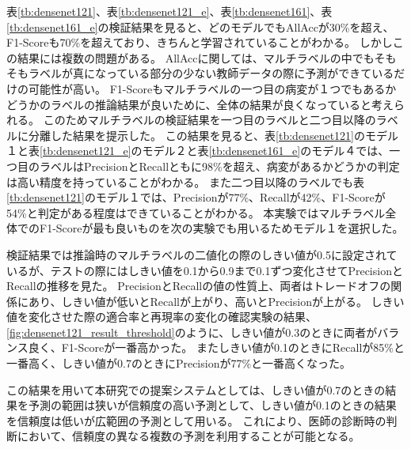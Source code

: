 表\ref{tb:densenet121}、表\ref{tb:densenet121_e}、表\ref{tb:densenet161}、表\ref{tb:densenet161_e}の検証結果を見ると、どのモデルでもAllAccが30\%を超え、F1-Scoreも70\%を超えており、きちんと学習されていることがわかる。
しかしこの結果には複数の問題がある。
AllAccに関しては、マルチラベルの中でもそもそもラベルが真になっている部分の少ない教師データの際に予測ができているだけの可能性が高い。
F1-Scoreもマルチラベルの一つ目の病変が１つでもあるかどうかのラベルの推論結果が良いために、全体の結果が良くなっていると考えられる。
このためマルチラベルの検証結果を一つ目のラベルと二つ目以降のラベルに分離した結果を提示した。
この結果を見ると、表\ref{tb:densenet121}のモデル１と表\ref{tb:densenet121_e}のモデル２と表\ref{tb:densenet161_e}のモデル４では、一つ目のラベルはPrecisionとRecallともに98\%を超え、病変があるかどうかの判定は高い精度を持っていることがわかる。
また二つ目以降のラベルでも表\ref{tb:densenet121}のモデル１では、Precisionが77\%、Recallが42\%、F1-Scoreが54\%と判定がある程度はできていることがわかる。
本実験ではマルチラベル全体でのF1-Scoreが最も良いものを次の実験でも用いるためモデル１を選択した。

検証結果では推論時のマルチラベルの二値化の際のしきい値が0.5に設定されているが、テストの際にはしきい値を0.1から0.9まで0.1ずつ変化させてPrecisionとRecallの推移を見た。
PrecisionとRecallの値の性質上、両者はトレードオフの関係にあり、しきい値が低いとRecallが上がり、高いとPrecisionが上がる。
しきい値を変化させた際の適合率と再現率の変化の確認実験の結果、\ref{fig:densenet121_result_threshold}のように、しきい値が0.3のときに両者がバランス良く、F1-Scoreが一番高かった。
またしきい値が0.1のときにRecallが85\%と一番高く、しきい値が0.7のときにPrecisionが77\%と一番高くなった。

この結果を用いて本研究での提案システムとしては、しきい値が0.7のときの結果を予測の範囲は狭いが信頼度の高い予測として、しきい値が0.1のときの結果を信頼度は低いが広範囲の予測として用いる。
これにより、医師の診断時の判断において、信頼度の異なる複数の予測を利用することが可能となる。


